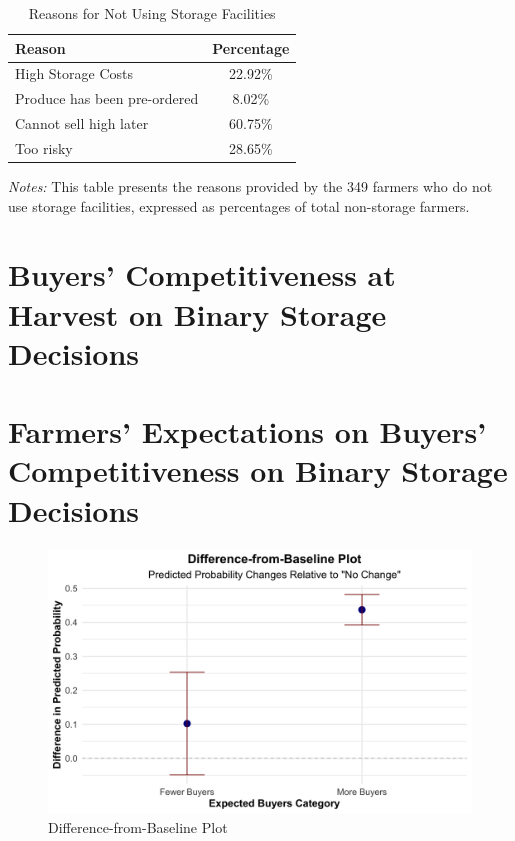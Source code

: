 \documentclass[12pt]{article}
\begin{document}
\begin{table}[H]
    \centering
    \footnotesize
    \begin{threeparttable}
        \caption{Reasons for Not Using Storage Facilities}
        \label{tab:non_storage_reasons}
        \begin{tabular}{lc}
            \toprule
            \textbf{Reason} & \textbf{Percentage} \\
            \midrule
            High Storage Costs & 22.92\% \\
            Produce has been pre-ordered & 8.02\% \\
            Cannot sell high later & 60.75\% \\
            Too risky & 28.65\% \\
            \bottomrule
        \end{tabular}
        \begin{tablenotes}
            \item \textit{Notes:} This table presents the reasons provided by the 349 farmers who do not use storage facilities, expressed as percentages of total non-storage farmers.
        \end{tablenotes}
    \end{threeparttable}
\end{table}




\newpage
\section{Buyers' Competitiveness at Harvest on Binary Storage Decisions}




\newpage
\section{Farmers' Expectations on Buyers' Competitiveness on Binary Storage Decisions}





\begin{figure}[H]
\centering
\includegraphics[width=1\textwidth]{figures/filtered_difference_from_baseline_plot.png}
\caption{Difference-from-Baseline Plot}
\label{Figure: Difference-from-Baseline Plot}
\end{figure}
\end{document}
